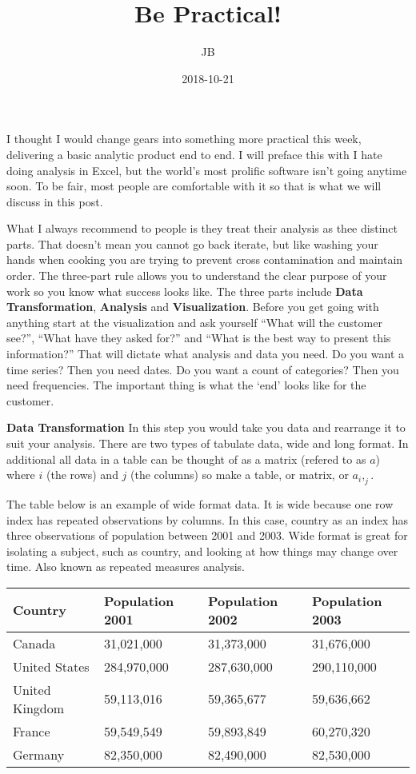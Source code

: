 \documentclass[]{article}
\title{Be Practical!}
\author{JB}
\date{2018-10-21}
\begin{document}
\maketitle

I thought I would change gears into something more practical this week,
delivering a basic analytic product end to end. I will preface this with
I hate doing analysis in Excel, but the world's most prolific software
isn't going anytime soon. To be fair, most people are comfortable with
it so that is what we will discuss in this post.

What I always recommend to people is they treat their analysis as thee
distinct parts. That doesn't mean you cannot go back iterate, but like
washing your hands when cooking you are trying to prevent cross
contamination and maintain order. The three-part rule allows you to
understand the clear purpose of your work so you know what success looks
like. The three parts include \textbf{Data Transformation},
\textbf{Analysis} and \textbf{Visualization}. Before you get going with
anything start at the visualization and ask yourself ``What will the
customer see?'', ``What have they asked for?'' and ``What is the best
way to present this information?'' That will dictate what analysis and
data you need. Do you want a time series? Then you need dates. Do you
want a count of categories? Then you need frequencies. The important
thing is what the `end' looks like for the customer.

\textbf{Data Transformation} In this step you would take you data and
rearrange it to suit your analysis. There are two types of tabulate
data, wide and long format. In additional all data in a table can be
thought of as a matrix (refered to as \(a\)) where \(i\) (the rows) and
\(j\) (the columns) so make a table, or matrix, or \(a_i,_j\).

The table below is an example of wide format data. It is wide because
one row index has repeated observations by columns. In this case,
country as an index has three observations of population between 2001
and 2003. Wide format is great for isolating a subject, such as country,
and looking at how things may change over time. Also known as repeated
measures analysis.

\begin{longtable}[]{@{}llll@{}}
\toprule
Country & Population 2001 & Population 2002 & Population
2003\tabularnewline
\midrule
\endhead
Canada & 31,021,000 & 31,373,000 & 31,676,000\tabularnewline
United States & 284,970,000 & 287,630,000 & 290,110,000\tabularnewline
United Kingdom & 59,113,016 & 59,365,677 & 59,636,662\tabularnewline
France & 59,549,549 & 59,893,849 & 60,270,320\tabularnewline
Germany & 82,350,000 & 82,490,000 & 82,530,000\tabularnewline
\bottomrule
\end{longtable}
\end{document}
